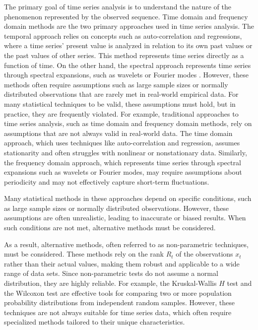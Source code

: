 The primary goal of time series analysis is to understand the nature of the phenomenon represented by the observed sequence. Time domain and frequency domain methods are the two primary approaches used in time series analysis. The temporal approach relies on concepts such as auto-correlation and regressions, where a time series' present value is analyzed in relation to its own past values or the past values of other series. This method represents time series directly as a function of time. On the other hand, the spectral approach represents time series through spectral expansions, such as wavelets or Fourier modes \cite{treitel1995spectral}. 
However, these methods often require assumptions such as large sample sizes or normally distributed observations that are rarely met in real-world empirical data. For many statistical techniques to be valid, these assumptions must hold, but in practice, they are frequently violated.
For example, traditional approaches to time series analysis, such as time domain and frequency domain methods, rely on assumptions that are not always valid in real-world data. The time domain approach, which uses techniques like auto-correlation and regression, assumes stationarity and often struggles with nonlinear or nonstationary data. Similarly, the frequency domain approach, which represents time series through spectral expansions such as wavelets or Fourier modes, may require assumptions about periodicity and may not effectively capture short-term fluctuations.

Many statistical methods in these approaches depend on specific conditions, such as large sample sizes or normally distributed observations. However, these assumptions are often unrealistic, leading to inaccurate or biased results. When such conditions are not met, alternative methods must be considered.

As a result, alternative methods, often referred to as non-parametric techniques, must be considered. These methods rely on the rank $R_t$ of the observations $x_t$ rather than their actual values, making them robust and applicable to a wide range of data sets. Since non-parametric tests do not assume a normal distribution, they are highly reliable. For example, the Kruskal-Wallis $H$ test and the Wilcoxon test are effective tools for comparing two or more population probability distributions from independent random samples. However, these techniques are not always suitable for time series data, which often require specialized methods tailored to their unique characteristics.

